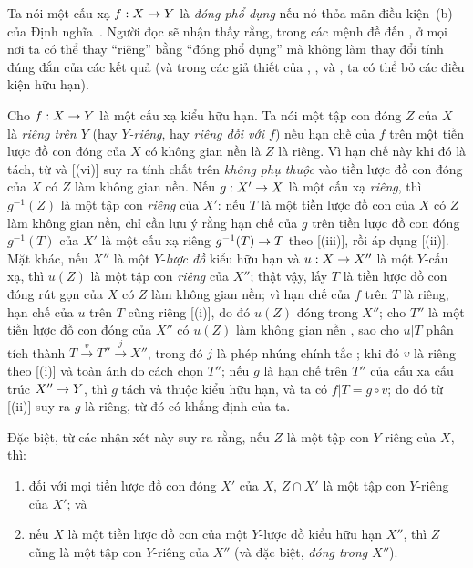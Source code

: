 \documentclass[oneside,10pt]{amsart}
\makeatletter
\newcommand{\ega@arrow}[2]{\mathchoice{#1}{#2}{#2}{#2}}
\renewcommand{\to}{\ega@arrow{\longrightarrow}{\rightarrow}}
\newcommand{\oldpage}[2][]{\marginnote{\normalfont\footnotesize\textbf{#1}~|~#2}\ignorespaces}
\let\EGAOriginalLabel\label
\renewcommand{\label}[1]{\phantomsection\EGAOriginalLabel{#1}}
\makeatother
\begin{document}
\begin{remark}[5.4.9]
\label{II.5.4.9}
Ta nói một cấu xạ $f:X\to Y$ là \emph{đóng phổ dụng} nếu nó thỏa mãn điều kiện~(b) của Định nghĩa~.
Người đọc sẽ nhận thấy rằng,
\oldpage[II]{103}
trong các mệnh đề  đến , ở mọi nơi ta có thể thay ``riêng'' bằng ``đóng phổ dụng'' mà không làm thay đổi tính đúng đắn của các kết quả (và trong các giả thiết của , ,  và , ta có thể bỏ các điều kiện hữu hạn).
\end{remark}

\begin{env}[5.4.10]
\label{II.5.4.10}
Cho $f:X\to Y$ là một cấu xạ kiểu hữu hạn.
Ta nói một tập con đóng $Z$ của $X$ là \emph{riêng trên $Y$} (hay \emph{$Y$-riêng}, hay \emph{riêng đối với $f$}) nếu hạn chế của $f$ trên một tiền lược đồ con đóng của $X$ có không gian nền là $Z$  là riêng.
Vì hạn chế này khi đó là tách, từ  và [(vi)] suy ra tính chất trên \emph{không phụ thuộc} vào tiền lược đồ con đóng của $X$ có $Z$ làm không gian nền.
Nếu $g:X'\to X$ là một cấu xạ \emph{riêng}, thì $g^{-1}(Z)$ là một tập con \emph{riêng} của $X'$:
nếu $T$ là một tiền lược đồ con của $X$ có $Z$ làm không gian nền, chỉ cần lưu ý rằng hạn chế của $g$ trên tiền lược đồ con đóng $g^{-1}(T)$ của $X'$ là một cấu xạ riêng $g^{-1}(T)\to T$ theo [(iii)], rồi áp dụng [(ii)].
Mặt khác, nếu $X''$ là một $Y$-\emph{lược đồ} kiểu hữu hạn và $u:X\to X''$ là một $Y$-cấu xạ, thì $u(Z)$ là một tập con \emph{riêng} của $X''$;
thật vậy, lấy $T$ là tiền lược đồ con đóng rút gọn của $X$ có $Z$ làm không gian nền;
vì hạn chế của $f$ trên $T$ là riêng, hạn chế của $u$ trên $T$ cũng riêng [(i)], do đó $u(Z)$ đóng trong $X''$;
cho $T''$ là một tiền lược đồ con đóng của $X''$ có $u(Z)$ làm không gian nền , sao cho $u|T$ phân tích thành $T\xrightarrow{v}T''\xrightarrow{j}X''$, trong đó $j$ là phép nhúng chính tắc ; khi đó $v$ là riêng theo [(i)] và toàn ánh do cách chọn $T''$;
nếu $g$ là hạn chế trên $T''$ của cấu xạ cấu trúc $X''\to Y$, thì $g$ tách và thuộc kiểu hữu hạn, và ta có $f|T=g\circ v$;
do đó từ [(ii)] suy ra $g$ là riêng, từ đó có khẳng định của ta.
\end{env}

Đặc biệt, từ các nhận xét này suy ra rằng, nếu $Z$ là một tập con $Y$-riêng của $X$, thì:
\begin{enumerate}
  \item đối với mọi tiền lược đồ con đóng $X'$ của $X$, $Z\cap X'$ là một tập con $Y$-riêng của $X'$; và
  \item nếu $X$ là một tiền lược đồ con của một $Y$-lược đồ kiểu hữu hạn $X''$, thì $Z$ cũng là một tập con $Y$-riêng của $X''$ (và đặc biệt, \emph{đóng trong $X''$}).
\end{enumerate}
\end{document}
